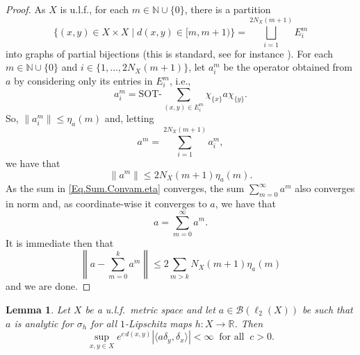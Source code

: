 \documentclass[11pt]{amsart}
\newcommand{\R}{\mathbb{R}}
\newcommand{\N}{\mathbb{N}}
\newcommand{\cB}{\mathcal{B}}
\newcommand{\SOTh}{\mathrm{SOT}\text{-}}
\numberwithin{equation}{section}
\newtheorem{lemma}[theorem]{Lemma}
\theoremstyle{definition}
\theoremstyle{remark}
\begin{document}
\begin{proof}
As $X$ is u.l.f.,   for each $m\in\N\cup\{0\}$, there is a partition
\[\{(x,y)\in X\times X\mid d(x,y)\in [m,m+1) \}=\bigsqcup_{i=1}^{2N_X(m+1)}E^m_i\]
into graphs of partial bijections (this is standard, see for instance   \cite[Lemma 2]{Ozawa2023}). For each $m\in\N\cup\{0\}$ and $i\in \{1,\ldots, 2N_X(m+1)\}$, let $a_i^m$ be the operator obtained from $a$ by considering only its entries in $E^m_i$, i.e.,  \[a_i^m=\SOTh\sum_{(x,y)\in E^m_i}\chi_{\{x\}}a\chi_{\{y\}}.\]
So, $\|a^m_i\|\leq \eta_a(m)$ and, letting \[a^m=\sum_{i=1}^{2N_X(m+1)}a^m_i,\]
we have that \[\|a^m\|\leq 2N_X(m+1)\eta_a(m).\]
As the sum in \eqref{Eq.Sum.Convam.eta} converges, the sum $\sum_{m=0}^\infty a^m$ also converges in norm and, as coordinate-wise it converges to $a$, we have that
\[a=\sum_{m=0}^\infty a^m.\]
It is immediate then that
\[\left\|a-\sum_{m=0}^ka^m\right\|\leq 2\sum_{m>k}N_X(m+1)\eta_a(m)\]
and we are done.\end{proof}

\begin{lemma}\label{lem:allrates}
Let $X$ be a u.l.f.\ metric space and let $a\in \cB(\ell_2(X))$ be such that $a$ is analytic for $\sigma_h$ for all $1$-Lipschitz maps $h\colon X\to \R$.  Then \[\sup_{x,y\in X}e^{c\,d(x,y)}|\langle a\delta_y,\delta_x\rangle|<\infty\ \text{ for all }\ c>0.\]
\end{lemma}
\end{document}

